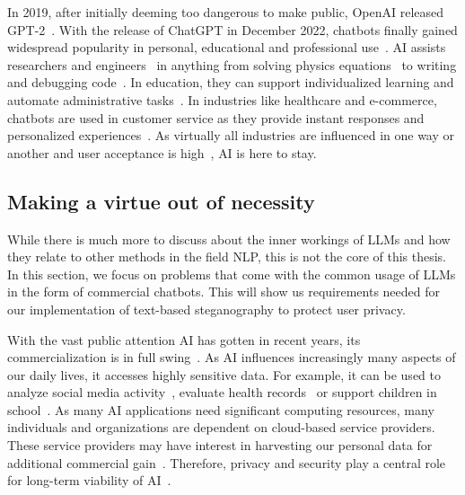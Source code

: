 In 2019, after initially deeming too dangerous to make public, OpenAI released GPT-2~\cite{hernNewAIFake2019}. With the release of ChatGPT in December 2022, chatbots finally gained widespread popularity in personal, educational and professional use~\cite{wuUnveilingSecurityPrivacy2024}. \gls{AI} assists researchers and engineers~\cite{schmidgallAgentLaboratoryUsing2025} in anything from solving physics equations~\cite{panQuantumManybodyPhysics2025,songLLMFeynmanLeveragingLarge2025} to writing and debugging code~\cite{shiCodeCorrectnessClosing2024,tianDebugBenchEvaluatingDebugging2024,leeUnifiedDebuggingApproach2024,leeGitHubRecentBugs2024}. In education, they can support individualized learning and automate administrative tasks~\cite{mienyeChatGPTEducationReview2025}. In industries like healthcare and e-commerce, chatbots are used in customer service as they provide instant responses and personalized experiences~\cite{wangELIZAChatGPTBrief2024}. As virtually all industries are influenced in one way or another and user acceptance is high~\cite{wangHistoryDevelopmentPrinciples2024,wangELIZAChatGPTBrief2024}, \gls{AI} is here to stay.

\subsection{Making a virtue out of necessity}
\label{sec:makingAVirtueOutOfNecessity}
While there is much more to discuss about the inner workings of \glspl{LLM} and how they relate to other methods in the field \gls{NLP}, this is not the core of this thesis. In this section, we focus on problems that come with the common usage of \glspl{LLM} in the form of commercial chatbots. This will show us requirements needed for our implementation of text-based steganography to protect user privacy.

With the vast public attention \gls{AI} has gotten in recent years, its commercialization is in full swing~\cite{soniOpenAIOutlinesNew2025}. As \gls{AI} influences increasingly many aspects of our daily lives, it accesses highly sensitive data. For example, it can be used to analyze social media activity~\cite{sufiSocialMediaAnalytics2023}, evaluate health records~\cite{lovonEvaluatingLLMAbilities2025} or support children in school~\cite{mienyeChatGPTEducationReview2025}. As many \gls{AI} applications need significant computing resources, many individuals and organizations are dependent on cloud-based service providers. These service providers may have interest in harvesting our personal data for additional commercial gain~\cite{biddleFacebookEngineersWe2022,mccallumMetaFacebookOwner2023}. Therefore, privacy and security play a central role for long-term viability of \gls{AI}~\cite{guptaChatGPTThreatGPTImpact2023,wuUnveilingSecurityPrivacy2024}.

